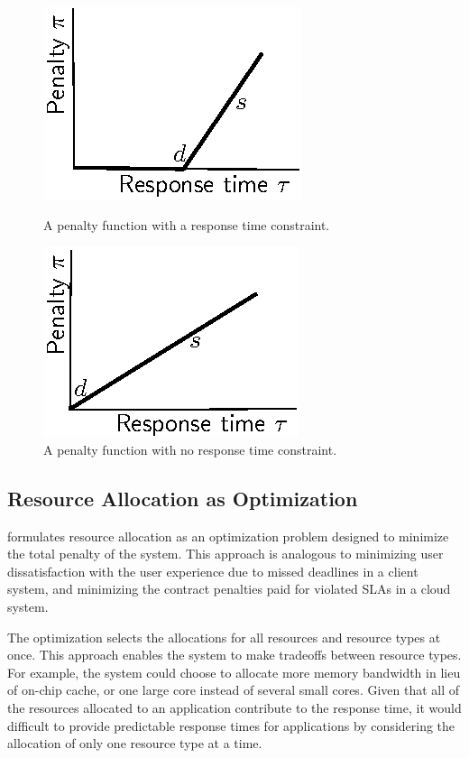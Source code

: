 \begin{figure}[hb]
\parbox{1.6in}{
\includegraphics*{Figures/Penalty1.eps}
\caption{\label{f:pen1}A penalty function with a response time constraint.}
}
\hspace{\fill}
\parbox{1.6in}{
\includegraphics*{Figures/Penalty2.eps}
\caption{\label{f:pen2}A penalty function with no response time constraint.}
}
\end{figure}

\subsection{Resource Allocation as Optimization}

\pacora formulates resource allocation as an optimization problem
designed to minimize the total penalty of the system. This approach is
analogous to minimizing user dissatisfaction with the user experience
due to missed deadlines in a client system, and minimizing the contract
penalties paid for violated SLAs in a cloud
system.

The optimization selects the allocations for all resources and
resource types at once.  This approach enables the system to make
tradeoffs between resource types.  For example, the system could
choose to allocate more memory bandwidth in lieu of on-chip cache, or
one large core instead of several small cores.  Given that all of the
resources allocated to an application contribute to the response time,
it would difficult to provide predictable response times for
applications by considering the allocation of only one resource type at a
time.

